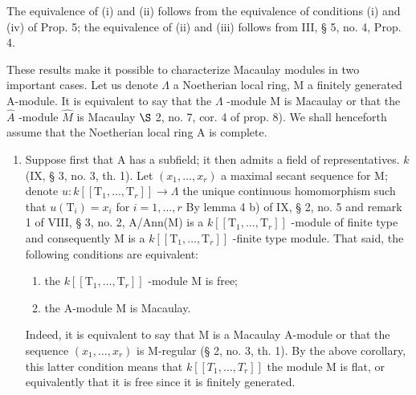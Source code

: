 The equivalence of (i) and (ii) follows from the equivalence of conditions (i) and (iv) of Prop. 5; the equivalence of (ii) and (iii) follows from III, § 5, no. 4, Prop. 4.

These results make it possible to characterize Macaulay modules in two important cases. Let us denote \(\Lambda\) a Noetherian local ring, M a finitely generated A-module. It is equivalent to say that the \(\Lambda\) -module M is Macaulay or that the \(\widehat{A}\) -module \(\widehat{M}\) is Macaulay \(\S\) 2, no. 7, cor. 4 of prop. 8). We shall henceforth assume that the Noetherian local ring A is complete.

\begin{enumerate}
\def\labelenumi{\arabic{enumi})}
\tightlist
\item
  Suppose first that A has a subfield; it then admits a field of representatives. \(k\) (IX, § 3, no. 3, th. 1). Let \((x_{1},\ldots ,x_{r})\) a maximal secant sequence for M; denote \(u:k[[\mathrm{T}_{1},\dots ,\mathrm{T}_{r}]]\longrightarrow \Lambda\) the unique continuous homomorphism such that \(u(\mathrm{T}_i) = x_i\) for \(i = 1,\dots ,r\) By lemma 4 b) of IX, § 2, no. 5 and remark 1 of VIII, § 3, no. 2, A/Ann(M) is a \(k[[\mathrm{T}_{1},\dots ,\mathrm{T}_{r}]]\) -module of finite type and consequently M is a \(k[[\mathrm{T}_{1},\dots ,\mathrm{T}_{r}]]\) -finite type module. That said, the following conditions are equivalent:
  \begin{enumerate}
  \def\labelenumii{(\roman{enumii})}
  \item
  the \(k[[\mathrm{T}_1,\dots ,\mathrm{T}_r]]\) -module M is free;
\item
  the A-module M is Macaulay.
\end{enumerate}

Indeed, it is equivalent to say that M is a Macaulay A-module or that the sequence \((x_{1},\ldots,x_{r})\) is M-regular (§ 2, no. 3, th. 1). By the above corollary, this latter condition means that \(k[[T_{1},\ldots,T_{r}]]\) the module M is flat, or equivalently that it is free since it is finitely generated.


\end{enumerate}
